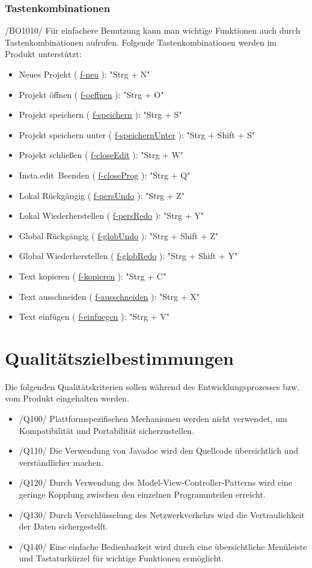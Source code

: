 \documentclass{scrartcl}
\newcommand{\name}{Insta.edit}
\newcommand{\refFunction}[1]{%
  \hyperlink{#1}{\csname #1\endcsname}%
  }
\begin{document}
\subsubsection{Tastenkombinationen}
\label{subsubsec:tastenkombinationen}
/BO1010/ Für einfachere Benutzung kann man wichtige Funktionen auch durch Tastenkombinationen aufrufen. Folgende Tastenkombinationen werden im Produkt unterstützt:
\begin{itemize}
\item Neues Projekt (\refFunction{f-neu}): "Strg + N"
\item Projekt öffnen (\refFunction{f-oeffnen}): "Strg + O"
\item Projekt speichern (\refFunction{f-speichern}): "Strg + S"
\item Projekt speichern unter (\refFunction{f-speichernUnter}): "Strg + Shift + S"
\item Projekt schließen (\refFunction{f-closeEdit}): "Strg + W"
\item \name\ Beenden (\refFunction{f-closeProg}): "Strg + Q"
\item Lokal Rückgängig (\refFunction{f-persUndo}): "Strg + Z"
\item Lokal Wiederherstellen (\refFunction{f-persRedo}): "Strg + Y"
\item Global Rückgängig (\refFunction{f-globUndo}): "Strg + Shift + Z"
\item Global Wiederherstellen (\refFunction{f-globRedo}): "Strg + Shift + Y"
\item Text kopieren (\refFunction{f-kopieren}): "Strg + C"
\item Text ausschneiden (\refFunction{f-ausschneiden}): "Strg + X"
\item Text einfügen (\refFunction{f-einfuegen}): "Strg + V"
\end{itemize}
 


\section{Qualitätszielbestimmungen}

Die folgenden Qualitätskriterien sollen während des Entwicklungsprozesses bzw. vom Produkt eingehalten werden.

\begin{itemize}
\item /Q100/ Plattformspezifischen Mechanismen werden nicht verwendet, um Kompatibilität und Portabilität sicherzustellen.
\item /Q110/ Die Verwendung von Javadoc wird den Quellcode übersichtlich und verständlicher machen.
\item /Q120/ Durch Verwendung des Model-View-Controller-Patterns wird eine geringe Kopplung zwischen den einzelnen Programmteilen erreicht.
\item /Q130/ Durch Verschlüsselung des Netzwerkverkehrs wird die Vertraulichkeit der Daten sichergestellt.
\item /Q140/ Eine einfache Bedienbarkeit wird durch eine übersichtliche Menüleiste und Tastaturkürzel für wichtige Funktionen ermöglicht.
\end{itemize}
\end{document}
